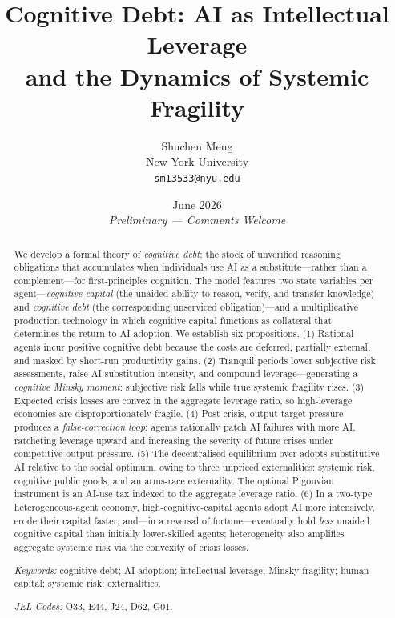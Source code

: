 \documentclass[12pt]{article}
\begin{document}
\title{\textbf{Cognitive Debt: AI as Intellectual Leverage \\ and the Dynamics of Systemic Fragility}}

\author{Shuchen Meng\\
\small New York University\\
\small \texttt{sm13533@nyu.edu}}

\date{June 2026 \\ \small \textit{Preliminary --- Comments Welcome}}

\maketitle

\begin{abstract}
\noindent
We develop a formal theory of \emph{cognitive debt}: the stock of unverified
reasoning obligations that accumulates when individuals use AI as a
substitute---rather than a complement---for first-principles cognition.
The model features two state variables per agent---\emph{cognitive capital}
(the unaided ability to reason, verify, and transfer knowledge) and
\emph{cognitive debt} (the corresponding unserviced obligation)---and
a multiplicative production technology in which cognitive capital functions
as collateral that determines the return to AI adoption.
We establish six propositions. (1) Rational agents incur positive cognitive
debt because the costs are deferred, partially external, and masked by short-run
productivity gains. (2) Tranquil periods lower subjective risk assessments, raise
AI substitution intensity, and compound leverage---generating a \emph{cognitive
Minsky moment}: subjective risk falls while true systemic fragility rises.
(3) Expected crisis losses are convex in the aggregate leverage ratio, so high-leverage
economies are disproportionately fragile. (4) Post-crisis, output-target pressure
produces a \emph{false-correction loop}: agents rationally patch AI failures with
more AI, ratcheting leverage upward and increasing the severity of future crises under competitive output pressure. (5) The
decentralised equilibrium over-adopts substitutive AI relative to the social
optimum, owing to three unpriced externalities: systemic risk, cognitive public
goods, and an arms-race externality. The optimal Pigouvian instrument is an
AI-use tax indexed to the aggregate leverage ratio. (6) In a
two-type heterogeneous-agent economy, high-cognitive-capital agents adopt AI
more intensively, erode their capital faster, and---in a reversal of fortune---eventually
hold \emph{less} unaided cognitive capital than initially lower-skilled agents;
heterogeneity also amplifies aggregate systemic risk via the convexity of crisis losses.
\smallskip

\noindent\textit{Keywords:} cognitive debt; AI adoption; intellectual leverage;
Minsky fragility; human capital; systemic risk; externalities.

\noindent\textit{JEL Codes:} O33, E44, J24, D62, G01.
\end{abstract}
\end{document}
